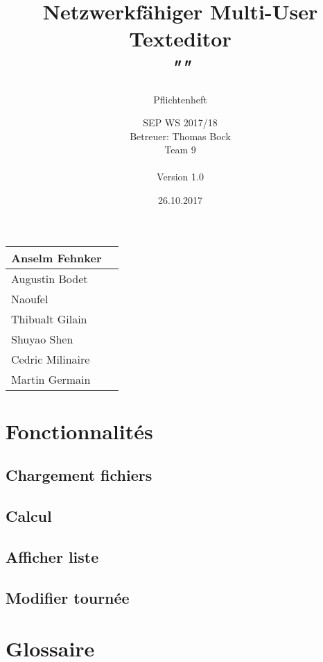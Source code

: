\documentclass{scrartcl}
\title{Netzwerkfähiger Multi-User Texteditor\\
\textit{"\name"}}
\subtitle{Pflichtenheft}
\author{SEP WS 2017/18\\
Betreuer: Thomas Bock\\
Team 9\\ \\
Version 1.0}
\date{26.10.2017}
\begin{document}
\maketitle

\iffalse
\begin{figure}[h]
	\centering
  \texttt{[image: ../img/insta\_logo]}
	\label{fig:logo}
\end{figure}
\fi
\vfill

\begin{center}
  \begin{tabular}{ | l | r | }
    \hline
    Anselm Fehnker \\ \hline
    Augustin Bodet  \\ \hline
    Naoufel \\ \hline
    Thibualt Gilain \\ \hline
    Shuyao Shen \\ \hline
    Cedric Milinaire\\ \hline
    Martin Germain \\ \hline
  \end{tabular}
\end{center}

\thispagestyle{empty}
\pagebreak
\renewcommand{\contentsname}{Table des matières}
\tableofcontents
\newpage

\section{Fonctionnalités}
\subsection{Chargement fichiers}
\subsection{Calcul}
\subsection{Afficher liste}
\subsection{Modifier tournée}

\section{Glossaire}
\end{document}
